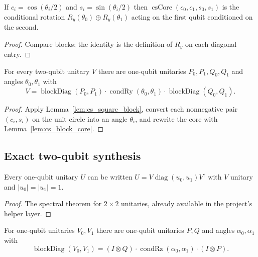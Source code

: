 \begin{lemma}
  \label{lem:cs_block_core}
  \leanok
  If $c_i = \cos(\theta_i/2)$ and $s_i = \sin(\theta_i/2)$ then
  $\operatorname{csCore}(c_0,c_1,s_0,s_1)$ is the conditional rotation
  $R_y(\theta_0)\oplus R_y(\theta_1)$ acting on the first qubit conditioned on
  the second.
\end{lemma}

\begin{proof}
  \leanok
  Compare blocks; the identity is the definition of $R_y$ on each diagonal
  entry.
\end{proof}

\begin{lemma}
  \label{lem:cs_exists_2q}
  \leanok
  For every two-qubit unitary $V$ there are one-qubit unitaries
  $P_0,P_1,Q_0,Q_1$ and angles $\theta_0,\theta_1$ with
  \[
    V = \operatorname{blockDiag}(P_0,P_1)\cdot
        \operatorname{condRy}(\theta_0,\theta_1)\cdot
        \operatorname{blockDiag}(Q_0,Q_1).
  \]
\end{lemma}

\begin{proof}
  \leanok
  Apply Lemma~\ref{lem:cs_square_block}, convert each nonnegative pair
  $(c_i,s_i)$ on the unit circle into an angle $\theta_i$, and rewrite the core
  with Lemma~\ref{lem:cs_block_core}.
\end{proof}

\subsection{Exact two-qubit synthesis}

\begin{lemma}
  \label{lem:oneq_diag}
  \leanok
  Every one-qubit unitary $U$ can be written $U = V \operatorname{diag}(u_0,u_1) V^\dagger$
  with $V$ unitary and $\lvert u_0\rvert = \lvert u_1\rvert = 1$.
\end{lemma}

\begin{proof}
  \leanok
  The spectral theorem for $2\times2$ unitaries, already available in the
  project's helper layer.
\end{proof}

\begin{lemma}
  \label{lem:demux_2q}
  \leanok
  For one-qubit unitaries $V_0, V_1$ there are one-qubit unitaries $P, Q$ and
  angles $\alpha_0,\alpha_1$ with
  \[
    \operatorname{blockDiag}(V_0,V_1)
      = (I\otimes Q)\cdot \operatorname{condRz}(\alpha_0,\alpha_1)
        \cdot (I\otimes P).
  \]
\end{lemma}

